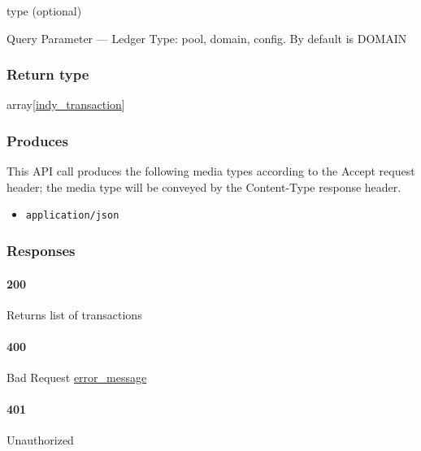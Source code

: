 type (optional)

{Query Parameter} --- Ledger Type: pool, domain, config. By default is
DOMAIN

\hypertarget{return-type-112}{%
\subsubsection{Return type}\label{return-type-112}}

array{[}\protect\hyperlink{indy_transaction}{indy\_transaction}{]}

\hypertarget{produces-143}{%
\subsubsection{Produces}\label{produces-143}}

This API call produces the following media types according to the
{Accept} request header; the media type will be conveyed by the
{Content-Type} response header.

\begin{itemize}
\tightlist
\item
  \texttt{application/json}
\end{itemize}

\hypertarget{responses-148}{%
\subsubsection{Responses}\label{responses-148}}

\hypertarget{section-475}{%
\paragraph{200}\label{section-475}}

Returns list of transactions

\hypertarget{section-476}{%
\paragraph{400}\label{section-476}}

Bad Request \protect\hyperlink{error_message}{error\_message}

\hypertarget{section-477}{%
\paragraph{401}\label{section-477}}

Unauthorized \protect\hyperlink{}{}

